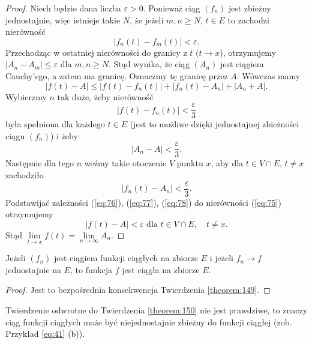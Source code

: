 \documentclass[leqno]{article}
\begin{document}
\begin{justify}
\begin{proof}
    Niech będzie dana liczba $\varepsilon > 0$. Ponieważ ciąg $(f_n)$ jest zbieżny jednostajnie, więc istnieje
    takie $N$, że jeżeli $m,n \geqslant N$, $t \in E$ to zachodzi nierówność 
    \[
        |f_n(t) - f_m(t)| < \varepsilon.
    \]
    Przechodząc w ostatniej nierówności do granicy z $t$ ($t \to x$), otrzymujemy \\
    $|A_n - A_m| \leqslant \varepsilon$ dla $m, n \geqslant N$. Stąd wynika, że ciąg $(A_n)$ jest ciągiem Cauchy'ego, a zatem ma granicę. 
    Oznaczmy tę granicę przez $A$. Wówczas mamy
    \begin{equation}\label{eq:75}
        |f(t) - A| \leqslant |f(t) - f_n(t)| + |f_n(t) - A_n| + |A_n + A|.
    \end{equation}
    Wybierzmy $n$ tak duże, żeby nierówność 
    \begin{equation}\label{eq:76}
        |f(t) - f_n(t)| < \frac{\varepsilon}{3}
    \end{equation}
    była spełniona dla każdego $t \in E$ (jest to możliwe dzięki jednostajnej zbieżności ciągu $(f_n)$) i żeby
    \begin{equation}\label{eq:77}
        |A_n - A| < \frac{\varepsilon}{3}.
    \end{equation}
    Następnie dla tego $n$ weźmy takie otoczenie $V$ punktu $x$, aby dla $t \in V \cap E$, $t \neq x$ zachodziło
    \begin{equation}\label{eq:78}
        |f_n(t) - A_n| < \frac{\varepsilon}{3}.
    \end{equation} 
    Podstawijać zależności (\ref{eq:76}), (\ref{eq:77}), (\ref{eq:78}) do nierówności (\ref{eq:75}) otrzymujemy
    \[
        |f(t) - A| < \varepsilon \text{ dla } t \in V \cap E, \quad t \neq x.
    \]
    Stąd $\lim\limits_{t \to x}f(t) = \lim\limits_{n \to \infty}A_n$. 
\end{proof}

\begin{theorem}
{
    Jeżeli $(f_n)$ jest ciągiem funkcji ciągłych na zbiorze $E$ i jeżeli $f_n \to f$ jednostajnie na $E$, to funkcja $f$ jest ciągła na zbiorze $E$.
}
\end{theorem}

\begin{proof}
    Jest to bezpośrednia konsekwencja Twierdzenia \ref{theorem:149}.
\end{proof}

\begin{uwaga}
    Twierdzenie odwrotne do Twierdzenia \ref{theorem:150} nie jest prawdziwe, to znaczy ciąg funkcji 
    ciągłych może być niejednostajnie zbieżny do funkcji ciągłej (zob. Przykład \ref{eq:41} (b)). 
\end{uwaga}


\end{justify}
\end{document}
